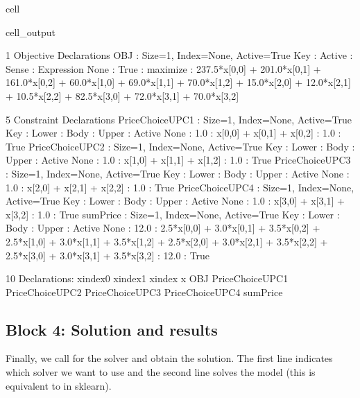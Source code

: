 \documentclass[letterpaper,10pt,english]{jupyterBook}
\begin{document}
\begin{sphinxuseclass}{cell}
\begin{sphinxVerbatimOutput}
\begin{sphinxuseclass}{cell_output}
\begin{sphinxVerbatim}[commandchars=\\\{\}]
1 Objective Declarations
    OBJ : Size=1, Index=None, Active=True
        Key  : Active : Sense    : Expression
        None :   True : maximize : 237.5*x[0,0] + 201.0*x[0,1] + 161.0*x[0,2] + 60.0*x[1,0] + 69.0*x[1,1] + 70.0*x[1,2] + 15.0*x[2,0] + 12.0*x[2,1] + 10.5*x[2,2] + 82.5*x[3,0] + 72.0*x[3,1] + 70.0*x[3,2]

5 Constraint Declarations
    PriceChoiceUPC1 : Size=1, Index=None, Active=True
        Key  : Lower : Body                     : Upper : Active
        None :   1.0 : x[0,0] + x[0,1] + x[0,2] :   1.0 :   True
    PriceChoiceUPC2 : Size=1, Index=None, Active=True
        Key  : Lower : Body                     : Upper : Active
        None :   1.0 : x[1,0] + x[1,1] + x[1,2] :   1.0 :   True
    PriceChoiceUPC3 : Size=1, Index=None, Active=True
        Key  : Lower : Body                     : Upper : Active
        None :   1.0 : x[2,0] + x[2,1] + x[2,2] :   1.0 :   True
    PriceChoiceUPC4 : Size=1, Index=None, Active=True
        Key  : Lower : Body                     : Upper : Active
        None :   1.0 : x[3,0] + x[3,1] + x[3,2] :   1.0 :   True
    sumPrice : Size=1, Index=None, Active=True
        Key  : Lower : Body                                                                                                                                                      : Upper : Active
        None :  12.0 : 2.5*x[0,0] + 3.0*x[0,1] + 3.5*x[0,2] + 2.5*x[1,0] + 3.0*x[1,1] + 3.5*x[1,2] + 2.5*x[2,0] + 3.0*x[2,1] + 3.5*x[2,2] + 2.5*x[3,0] + 3.0*x[3,1] + 3.5*x[3,2] :  12.0 :   True

10 Declarations: x\PYGZus{}index\PYGZus{}0 x\PYGZus{}index\PYGZus{}1 x\PYGZus{}index x OBJ PriceChoiceUPC1 PriceChoiceUPC2 PriceChoiceUPC3 PriceChoiceUPC4 sumPrice
\end{sphinxVerbatim}

\end{sphinxuseclass}\end{sphinxVerbatimOutput}

\end{sphinxuseclass}

\subsection{Block 4: Solution and results}
\label{\detokenize{docs/Case1_4_Module2A_Retail_Price_Optimization:block-4-solution-and-results}}
\sphinxAtStartPar
Finally, we call for the solver and obtain the solution. The first line indicates which solver we want to use and the second line solves the model (this is equivalent to  in sklearn).
\end{document}
